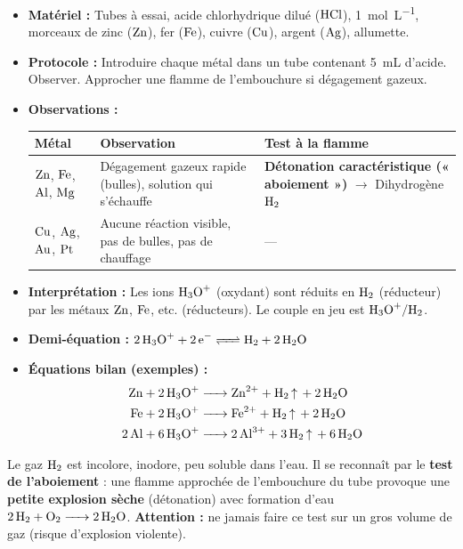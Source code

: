 \documentclass[11pt]{article}
\newcommand{\cle}[1]{{\popxbold\color{popdark}#1}}
\begin{document}
\begin{experience}
\begin{itemize}
  \item \textbf{Matériel :} Tubes à essai, acide chlorhydrique dilué ($\ce{HCl}$), \SI{1}{mol.L^{-1}}, morceaux de zinc ($\ce{Zn}$), fer ($\ce{Fe}$), cuivre ($\ce{Cu}$), argent ($\ce{Ag}$), allumette.
  \item \textbf{Protocole :} Introduire chaque métal dans un tube contenant \SI{5}{mL} d'acide. Observer. Approcher une flamme de l'embouchure si dégagement gazeux.
  \item \textbf{Observations :}
  \begin{center}
  \begin{tabularx}{\linewidth}{|l|X|X|}\hline
  \rowcolor{popblueL} \textbf{Métal} & \textbf{Observation} & \textbf{Test à la flamme} \\\hline
  $\ce{Zn}$, $\ce{Fe}$, $\ce{Al}$, $\ce{Mg}$ & Dégagement gazeux rapide (bulles), solution qui s'échauffe & \textbf{Détonation caractéristique (« aboiement »)} $\to$ \cle{Dihydrogène $\ce{H2}$} \\\hline
  $\ce{Cu}$, $\ce{Ag}$, $\ce{Au}$, $\ce{Pt}$ & Aucune réaction visible, pas de bulles, pas de chauffage & --- \\\hline
  \end{tabularx}
  \end{center}
  \item \textbf{Interprétation :} Les ions $\ce{H3O+}$ (oxydant) sont réduits en $\ce{H2}$ (réducteur) par les métaux $\ce{Zn}$, $\ce{Fe}$, etc. (réducteurs). Le couple en jeu est $\ce{H3O+}/\ce{H2}$.
  \item \textbf{Demi-équation :} $\ce{2H3O+ + 2e- <=> H2 + 2H2O}$
  \item \textbf{Équations bilan (exemples) :}
  \begin{align*}
    \ce{Zn + 2H3O+ &-> Zn^2+ + H2 ^ + 2H2O} \\
    \ce{Fe + 2H3O+ &-> Fe^2+ + H2 ^ + 2H2O} \\
    \ce{2Al + 6H3O+ &-> 2Al^3+ + 3H2 ^ + 6H2O}
  \end{align*}
\end{itemize}
\end{experience}

\begin{aretenir}
Le gaz $\ce{H2}$ est incolore, inodore, peu soluble dans l'eau. Il se reconnaît par le \textbf{test de l'aboiement} : une flamme approchée de l'embouchure du tube provoque une \textbf{petite explosion sèche} (détonation) avec formation d'eau $\ce{2H2 + O2 -> 2H2O}$. \textbf{Attention :} ne jamais faire ce test sur un gros volume de gaz (risque d'explosion violente).
\end{aretenir}
\end{document}
